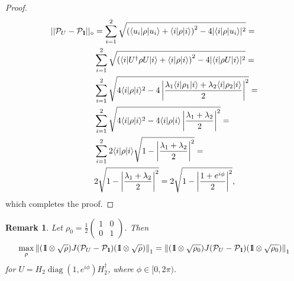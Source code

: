 \documentclass[11pt,a4paper,reqno, oneside]{amsart}
\DeclareMathOperator{\diag}{diag}
\newcommand{\ket}[1]{\ensuremath{|#1\rangle}}
\newcommand{\bra}[1]{\ensuremath{\langle#1|}}
\newcommand{\1}{{\rm 1\hspace{-0.9mm}l}}
\newcommand{\Id}{{\rm 1\hspace{-0.9mm}l}}
\newcommand{\PP}{\mathcal{P}}
\newtheorem{remark}{Remark}
\begin{document}
\begin{proof}
	\begin{equation}
	\begin{split}
	||\mathcal{P}_U - \mathcal{P}_{\1}||_\diamond &= \sum_{i=1}^2  \sqrt{\left(\bra{u_i}\rho\ket{u_i} + \bra{i} \rho \ket{i} \right)^2 - 4|\bra{i}\rho\ket{u_i}|^2} = \\& \sum_{i=1}^2  \sqrt{\left(\bra{i}U^\dagger\rho U \ket{i} + \bra{i} \rho \ket{i} \right)^2 - 4|\bra{i}\rho U \ket{i}|^2} = \\& \sum_{i=1}^2  \sqrt{4 \bra{i}\rho \ket{i}^2 - 4 \left| \frac{\lambda_1 \bra{i}\rho_1 \ket{i} + \lambda_2\bra{i} \rho_2\ket{i}}{2}\right|^2} =\\&  \sum_{i=1}^2  \sqrt{4 \bra{i}\rho \ket{i}^2 - 4 \bra{i} \rho \ket{i} \left| \frac{\lambda_1 + \lambda_2}{2}\right|^2} = \\&  \sum_{i=1}^2 2 \bra{i} \rho \ket{i} \sqrt{1 -\left| \frac{\lambda_1 + \lambda_2}{2}\right|^2 } = \\& 2 \sqrt{1 -\left| \frac{\lambda_1 + \lambda_2}{2}\right|^2 } = 
	2 \sqrt{1 -\left| \frac{1+e^{i \phi}}{2}\right|^2 } ,
	\end{split}
	\end{equation}
which completes the proof.
\end{proof}


\begin{remark}\label{lemma:rho}
	Let $\rho_{0} = \frac{1}{2} 
	\left(\begin{array}{cc}1&0\\0&1\end{array}\right)$. Then 
	\begin{equation}
	 \max_\rho \left\|(\1\otimes \sqrt{\rho}) J(\PP_U - \PP_{\Id}) 
	(\1\otimes 
	\sqrt{\rho})\right\|_1 =    \left\|(\1\otimes \sqrt{\rho_0}) J(\PP_U - 
	\PP_{\Id}) 
		(\1\otimes 
		\sqrt{\rho_0})\right\|_1
	\end{equation}
	for  $U = H_2\diag(1, e^{i \phi}) H_2^\dagger $, 
		where $\phi \in [0, 2\pi)$. 
\end{remark}
\end{document}

